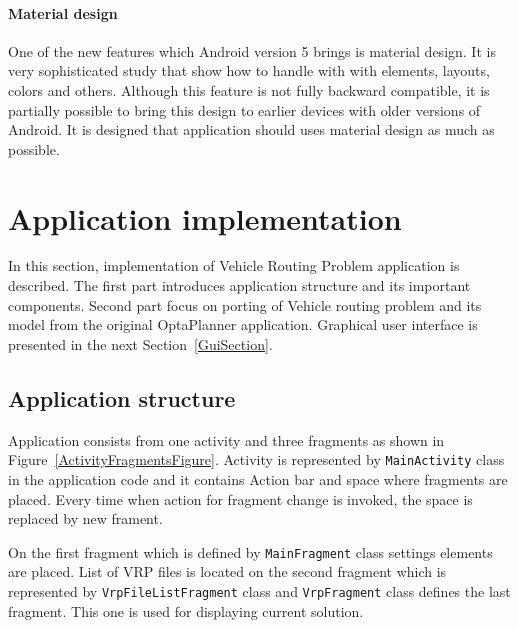 \paragraph{Material design}
One of the new features which Android version 5 brings is material design. It is very sophisticated study that show how
to handle with with elements, layouts, colors and others. Although this feature is not fully backward compatible, it is
partially possible to bring this design to earlier devices with older versions of Android. It is designed that
application should uses material design as much as possible.

\section{Application implementation}\label{ApplicationImplementationSection}
In this section, implementation of Vehicle Routing Problem application is described. The first part introduces
application structure and its important components. Second part focus on porting of Vehicle routing problem and its
model from the  original OptaPlanner application. Graphical user interface is presented in the next
Section~\ref{GuiSection}.

\subsection{Application structure} %
Application consists from one activity and three fragments as shown in Figure~\ref{ActivityFragmentsFigure}. Activity is
represented by \texttt{MainActivity} class in the application code and it contains Action bar and space where fragments
are placed. Every time when action for fragment change is invoked, the space is replaced by new frament.

On the first fragment which is defined by \texttt{MainFragment} class settings elements are placed. List of VRP files is
located on the second fragment which is represented by \texttt{VrpFileListFragment} class and \texttt{VrpFragment} class
defines the last fragment. This one is used for displaying current solution.

